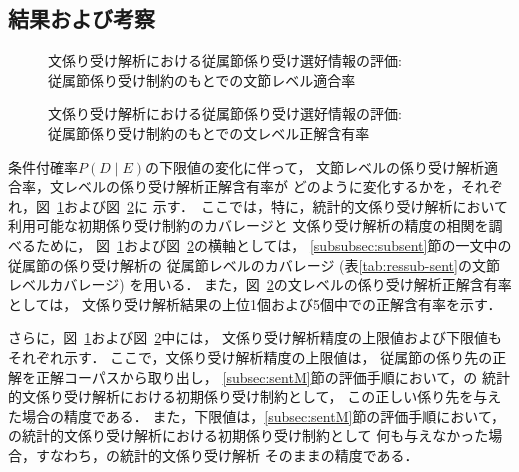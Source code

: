 \subsection{結果および考察}
\begin{figure}
  \begin{center}
\vspace*{-1mm}
       \caption{文係り受け解析における従属節係り受け選好情報の評価: \\
	従属節係り受け制約のもとでの文節レベル適合率}
        \label{fig:segeval}
  \end{center}
\end{figure}


\begin{figure}
\begin{center}

        \caption{文係り受け解析における従属節係り受け選好情報の評価: \\
	従属節係り受け制約のもとでの文レベル正解含有率}
        \label{fig:senteval}
\end{center}  
\end{figure}

条件付確率$P(D\mid E)$の下限値の変化に伴って，
文節レベルの係り受け解析適合率，\mbox{文レベル}の係り受け解析正解含有率が
どのように変化するかを，それぞれ，図~\ref{fig:segeval}および図~\ref{fig:senteval}に
\mbox{示す．
こ}こでは，特に，統計的文係り受け解析において利用可能な初期係り受け制約のカバレージと
文係り受け解析の精度の相関を調べるために，
図~\ref{fig:segeval}および図~\ref{fig:senteval}の横軸としては，
\ref{subsubsec:subsent}\mbox{節の一文中}の従属節の係り受け解析の
従属節レベルのカバレージ
(表\ref{tab:ressub-sent}の文節レベルカバレージ)
を用いる．
また，図~\ref{fig:senteval}の文レベルの係り受け解析正解含有率としては，
文係り受け解析結果の上位1個および5個中での正解含有率を示す．

さらに，図~\ref{fig:segeval}および図~\ref{fig:senteval}中には，
文係り受け解析精度の上限値および下限値もそれぞれ示す．
ここで，文係り受け解析精度の上限値は，
従属節の係り先の正解を正解コーパスから取り出し，
\ref{subsec:sentM}節の評価手順において，\cite{Fujio97aj,Fujio99aj}の
統計的文係り受け解析における初期係り受け制約として，
この正しい係り先を与えた場合の精度である．
また，下限値は，\ref{subsec:sentM}節の評価手順において，
\cite{Fujio97aj,Fujio99aj}の統計的文係り受け解析における初期係り受け制約として
何も与えなかった場合，すなわち，\cite{Fujio97aj,Fujio99aj}の統計的文係り受け解析
そのままの精度である．

